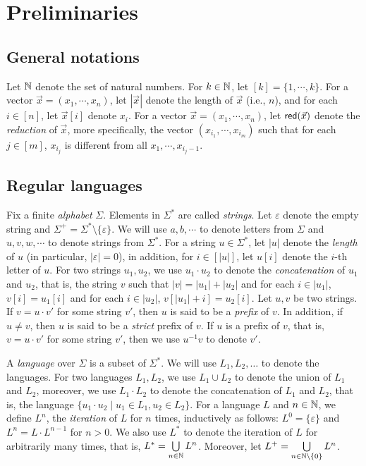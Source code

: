 
\section{Preliminaries}

\subsection*{General notations} 
Let $\mathbb{N}$ denote the set of natural numbers. For $k \in \mathbb{N}$, let $[k] = \{1,\cdots, k\}$. For a vector $\vec{x}=(x_1,\cdots, x_n)$, let $|\vec{x}|$ denote the length of $\vec{x}$ (i.e., $n$), and for each $i \in [n]$, let $\vec{x}[i]$ denote $x_i$. For a vector $\vec{x} = (x_1, \cdots, x_n)$, let $\mathsf{red}(\vec{x})$ denote the \emph{reduction} of $\vec{x}$, more specifically, the vector $(x_{i_1},\cdots, x_{i_m})$ such that for each $j \in [m]$, $x_{i_j}$ is different from all $x_1, \cdots, x_{i_j-1}$.


\subsection*{Regular languages}
Fix a finite \emph{alphabet} $\Sigma$. Elements in $\Sigma^*$ are called \emph{strings}. Let $\varepsilon$ denote the empty string and  $\Sigma^+ = \Sigma^* \setminus \{\varepsilon\}$. We will use $a,b,\cdots$ to denote letters from $\Sigma$ and $u, v, w, \cdots$ to denote strings from $\Sigma^*$. For a string $u \in \Sigma^*$, let $|u|$ denote the \emph{length} of $u$ (in particular, $|\varepsilon|=0$), in addition, for $i \in [|u|]$, let $u[i]$ denote the $i$-th letter of $u$. 
For two strings $u_1, u_2$, we use $u_1 \cdot u_2$ to denote the \emph{concatenation} of $u_1$ and $u_2$, that is, the string $v$ such that $|v|= |u_1| + |u_2|$ and for each $i \in |u_1|$, $v[i]= u_1[i]$ and for each $i \in |u_2|$, $v[|u_1|+i]=u_2[i]$. Let $u, v$ be two strings. If $v = u \cdot v'$ for some string $v'$, then $u$ is said to be a \emph{prefix} of $v$. In addition, if $u \neq v$, then $u$ is said to be a \emph{strict} prefix of $v$. If $u$ is a prefix of $v$, that is, $v = u \cdot v'$ for some string $v'$, then we use $u^{-1} v$ to denote $v'$. 

A \emph{language} over $\Sigma$ is a subset of $\Sigma^*$. We will use $L_1, L_2, \dots$ to denote the languages. For two languages $L_1, L_2$, we use $L_1 \cup L_2$ to denote the union of $L_1$ and $L_2$, moreover, we use $L_1 \cdot L_2$ to denote the concatenation of $L_1$ and $L_2$, that is, the language $\{u_1 \cdot u_2 \mid u_1 \in L_1, u_2 \in L_2\}$. For a language $L$ and $n \in \mathbb{N}$, we define $L^n$, the \emph{iteration} of $L$ for $n$ times, inductively as follows: $L^0=\{\varepsilon\}$ and $L^{n} =L \cdot L^{n-1}$ for $n > 0$. We also use $L^*$ to denote the iteration of $L$ for arbitrarily many times, that is, $L^* = \bigcup \limits_{n \in \mathbb{N}} L^n$. Moreover, let $L^+ = \bigcup \limits_{n \in \mathbb{N} \setminus \{0\}} L^n$.

